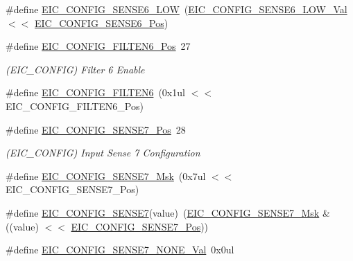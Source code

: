 \begin{DoxyCompactItemize}
\#define \mbox{\hyperlink{group___s_a_m_d21___e_i_c_gaa7f53acd84244664504de0dcd73d1bf3}{E\+I\+C\+\_\+\+C\+O\+N\+F\+I\+G\+\_\+\+S\+E\+N\+S\+E6\+\_\+\+L\+OW}}~(\mbox{\hyperlink{group___s_a_m_d21___e_i_c_ga3df3d29ae144b0c1d5b95a4f898fb78d}{E\+I\+C\+\_\+\+C\+O\+N\+F\+I\+G\+\_\+\+S\+E\+N\+S\+E6\+\_\+\+L\+O\+W\+\_\+\+Val}}     $<$$<$ \mbox{\hyperlink{group___s_a_m_d21___e_i_c_ga17d194da98be0777ff750650293d386d}{E\+I\+C\+\_\+\+C\+O\+N\+F\+I\+G\+\_\+\+S\+E\+N\+S\+E6\+\_\+\+Pos}})
\item 
\#define \mbox{\hyperlink{group___s_a_m_d21___e_i_c_ga1138acbe8b4dedc40a413a58ec7b2c57}{E\+I\+C\+\_\+\+C\+O\+N\+F\+I\+G\+\_\+\+F\+I\+L\+T\+E\+N6\+\_\+\+Pos}}~27
\begin{DoxyCompactList}\small\item\em (E\+I\+C\+\_\+\+C\+O\+N\+F\+IG) Filter 6 Enable \end{DoxyCompactList}\item 
\#define \mbox{\hyperlink{group___s_a_m_d21___e_i_c_gaa478e221fcdc48e552b61567e53ad83f}{E\+I\+C\+\_\+\+C\+O\+N\+F\+I\+G\+\_\+\+F\+I\+L\+T\+E\+N6}}~(0x1ul $<$$<$ E\+I\+C\+\_\+\+C\+O\+N\+F\+I\+G\+\_\+\+F\+I\+L\+T\+E\+N6\+\_\+\+Pos)
\item 
\#define \mbox{\hyperlink{group___s_a_m_d21___e_i_c_ga19583c715708b15f578f5cc2a8f394fc}{E\+I\+C\+\_\+\+C\+O\+N\+F\+I\+G\+\_\+\+S\+E\+N\+S\+E7\+\_\+\+Pos}}~28
\begin{DoxyCompactList}\small\item\em (E\+I\+C\+\_\+\+C\+O\+N\+F\+IG) Input Sense 7 Configuration \end{DoxyCompactList}\item 
\#define \mbox{\hyperlink{group___s_a_m_d21___e_i_c_ga02110a1b2861cc0350c98fc35963c3a6}{E\+I\+C\+\_\+\+C\+O\+N\+F\+I\+G\+\_\+\+S\+E\+N\+S\+E7\+\_\+\+Msk}}~(0x7ul $<$$<$ E\+I\+C\+\_\+\+C\+O\+N\+F\+I\+G\+\_\+\+S\+E\+N\+S\+E7\+\_\+\+Pos)
\item 
\#define \mbox{\hyperlink{group___s_a_m_d21___e_i_c_ga65967e0d923c427a2dbebafb0dd5238b}{E\+I\+C\+\_\+\+C\+O\+N\+F\+I\+G\+\_\+\+S\+E\+N\+S\+E7}}(value)~(\mbox{\hyperlink{group___s_a_m_d21___e_i_c_ga02110a1b2861cc0350c98fc35963c3a6}{E\+I\+C\+\_\+\+C\+O\+N\+F\+I\+G\+\_\+\+S\+E\+N\+S\+E7\+\_\+\+Msk}} \& ((value) $<$$<$ \mbox{\hyperlink{group___s_a_m_d21___e_i_c_ga19583c715708b15f578f5cc2a8f394fc}{E\+I\+C\+\_\+\+C\+O\+N\+F\+I\+G\+\_\+\+S\+E\+N\+S\+E7\+\_\+\+Pos}}))
\item 
\#define \mbox{\hyperlink{group___s_a_m_d21___e_i_c_gad238f5412dacf421dc698fbb1e6be2f2}{E\+I\+C\+\_\+\+C\+O\+N\+F\+I\+G\+\_\+\+S\+E\+N\+S\+E7\+\_\+\+N\+O\+N\+E\+\_\+\+Val}}~0x0ul

\end{DoxyCompactItemize}
